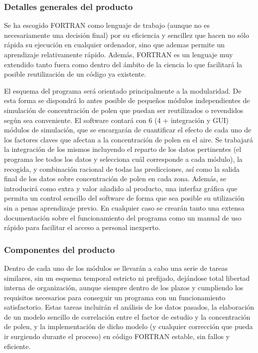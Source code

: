 \documentclass[12pt,oneside,a4paper]{article}
\numberwithin{figure}{section}
\begin{document}
\subsubsection{Detalles generales del producto}

Se ha escogido FORTRAN como lenguaje de trabajo (aunque no es necesariamente una decisión final) por su eficiencia y sencillez que hacen no sólo rápida su ejecución en cualquier ordenador, sino que ademas permite un aprendizaje relativamente rápido. Además, FORTRAN es un lenguaje muy extendido tanto fuera como dentro del ámbito de la ciencia lo que facilitará la posible reutilización de un código ya existente.

El esquema del programa será orientado principalmente a la modularidad. De esta forma se dispondrá lo antes posible de pequeños módulos independientes de simulación de concentración de polen que puedan ser reutilizados o revendidos según sea conveniente. El software contará con 6 (4 + integración y GUI) módulos de simulación, que se encargarán de cuantificar el efecto de cada uno de los factores claves que afectan a la concentración de polen en el aire. Se trabajará la integración de los mismos incluyendo el reparto de los datos pertinentes (el programa lee todos los datos y selecciona cuál corresponde a cada módulo), la recogida, y combinación racional de todas las predicciones, así como la salida final de los datos sobre concentración de polen en cada zona. Además, se introducirá como extra y valor añadido al producto, una interfaz gráfica que permita un control sencillo del software de forma que sea posible su utilización sin a penas aprendizaje previo. En cualquier caso se crearán tanto una extensa documentación sobre el funcionamiento del programa como un manual de uso rápido para facilitar el acceso a personal inexperto.

\subsubsection{Componentes del producto}

Dentro de cada uno de los módulos se llevarán a cabo una serie de tareas similares, sin un esquema temporal estricto ni prefijado, dejándose total libertad interna de organización, aunque siempre dentro de los plazos y cumpliendo los requisitos necesarios para conseguir un programa con un funcionamiento satisfactorio. Estas tareas incluirán el análisis de los datos pasados, la elaboración de un modelo sencillo de correlación entre el factor de estudio y la concentración de polen, y la implementación de dicho modelo (y cualquier corrección que pueda ir surgiendo durante el proceso) en código FORTRAN estable, sin fallos y eficiente.
\end{document}

